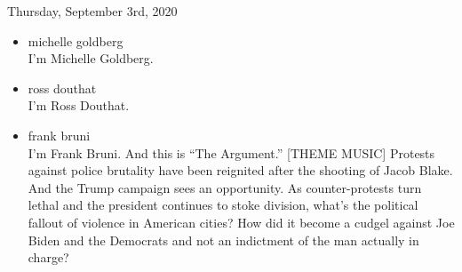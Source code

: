 Thursday, September 3rd, 2020

\begin{itemize}
\item
  michelle goldberg\\
  I'm Michelle Goldberg.
\item
  ross douthat\\
  I'm Ross Douthat.
\item
  frank bruni\\
  I'm Frank Bruni. And this is ``The Argument.'' {[}THEME MUSIC{]}
  Protests against police brutality have been reignited after the
  shooting of Jacob Blake. And the Trump campaign sees an opportunity.
  As counter-protests turn lethal and the president continues to stoke
  division, what's the political fallout of violence in American cities?
  How did it become a cudgel against Joe Biden and the Democrats and not
  an indictment of the man actually in charge?


\end{itemize}

